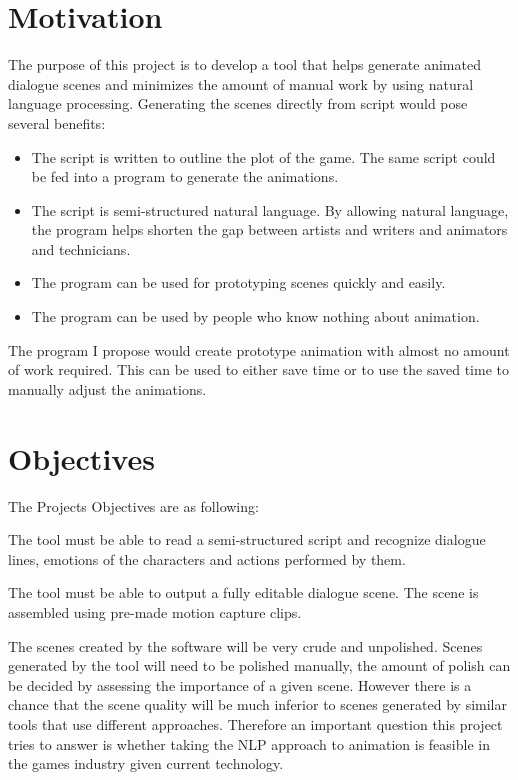 \section{Motivation}

The purpose of this project is to develop a tool that helps generate animated dialogue scenes and minimizes the amount of manual work by using natural language processing. Generating the scenes directly from script would pose several benefits:

\begin{itemize}
	\item The script is written to outline the plot of the game. The same script could be fed into a program to generate the animations.
	\item The script is semi-structured natural language. By allowing natural language, the program helps shorten the gap between artists and writers and animators and technicians.
	\item The program can be used for prototyping scenes quickly and easily.
	\item The program can be used by people who know nothing about animation.
\end{itemize}

The program I propose would create prototype animation with almost no amount of work required. This can be used to either save time or to use the saved time to manually adjust the animations.

\section{Objectives}

The Projects Objectives are as following:


\noindent The tool must be able to read a semi-structured script and recognize dialogue lines, emotions of the characters and actions performed by them.


\noindent The tool must be able to output a fully editable dialogue scene. The scene is assembled using pre-made motion capture clips.

\bigskip
The scenes created by the software will be very crude and unpolished. Scenes generated by the tool will need to be polished manually, the amount of polish can be decided by assessing the importance of a given scene. However there is a chance that the scene quality will be much inferior to scenes generated by similar tools that use different approaches. Therefore an important question this project tries to answer is whether taking the NLP approach to animation is feasible in the games industry given current technology.
